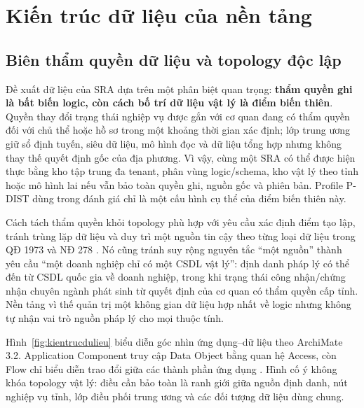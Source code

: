 \section{Kiến trúc dữ liệu của nền tảng}
\label{sec:data}

\subsection{Biên thẩm quyền dữ liệu và topology độc lập}
\label{subsec:phanlopdulieu}

Đề xuất dữ liệu của SRA dựa trên một phân biệt quan trọng: \textbf{thẩm quyền ghi là bất biến logic, còn cách bố trí dữ liệu vật lý là điểm biến thiên}. Quyền thay đổi trạng thái nghiệp vụ được gắn với cơ quan đang có thẩm quyền đối với chủ thể hoặc hồ sơ trong một khoảng thời gian xác định; lớp trung ương giữ sổ định tuyến, siêu dữ liệu, mô hình đọc và dữ liệu tổng hợp nhưng không thay thế quyết định gốc của địa phương. Vì vậy, cùng một SRA có thể được hiện thực bằng kho tập trung đa tenant, phân vùng logic/schema, kho vật lý theo tỉnh hoặc mô hình lai nếu vẫn bảo toàn quyền ghi, nguồn gốc và phiên bản. Profile P-DIST dùng trong đánh giá chỉ là một cấu hình cụ thể của điểm biến thiên này.

Cách tách thẩm quyền khỏi topology phù hợp với yêu cầu xác định điểm tạo lập, tránh trùng lặp dữ liệu và duy trì một nguồn tin cậy theo từng loại dữ liệu trong QĐ 1973 và NĐ 278 \citep{qd1973_2026,nd278_2025}. Nó cũng tránh suy rộng nguyên tắc ``một nguồn'' thành yêu cầu ``một doanh nghiệp chỉ có một CSDL vật lý'': định danh pháp lý có thể đến từ CSDL quốc gia về doanh nghiệp, trong khi trạng thái công nhận/chứng nhận chuyên ngành phát sinh từ quyết định của cơ quan có thẩm quyền cấp tỉnh. Nền tảng vì thế quản trị một không gian dữ liệu hợp nhất về logic nhưng không tự nhận vai trò nguồn pháp lý cho mọi thuộc tính.

Hình~\ref{fig:kientrucdulieu} biểu diễn góc nhìn ứng dụng--dữ liệu theo ArchiMate 3.2. Application Component truy cập Data Object bằng quan hệ Access, còn Flow chỉ biểu diễn trao đổi giữa các thành phần ứng dụng \citep[Chs.~5, 9; Apps.~A--B]{archimate32_2023}. Hình cố ý không khóa topology vật lý: điều cần bảo toàn là ranh giới giữa nguồn định danh, nút nghiệp vụ tỉnh, lớp điều phối trung ương và các đối tượng dữ liệu dùng chung.

